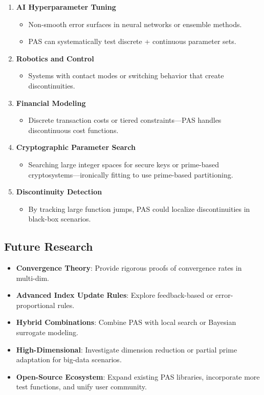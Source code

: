 \documentclass[10pt,twocolumn,letterpaper]{article}
\begin{document}
\begin{enumerate}
    \item \textbf{AI Hyperparameter Tuning}
    \begin{itemize}
        \item Non-smooth error surfaces in neural networks or ensemble methods.
        \item PAS can systematically test discrete + continuous parameter sets.
    \end{itemize}
    
    \item \textbf{Robotics and Control}
    \begin{itemize}
        \item Systems with contact modes or switching behavior that create discontinuities.
    \end{itemize}
    
    \item \textbf{Financial Modeling}
    \begin{itemize}
        \item Discrete transaction costs or tiered constraints—PAS handles discontinuous cost functions.
    \end{itemize}
    
    \item \textbf{Cryptographic Parameter Search}
    \begin{itemize}
        \item Searching large integer spaces for secure keys or prime-based cryptosystems—ironically fitting to use prime-based partitioning.
    \end{itemize}
    
    \item \textbf{Discontinuity Detection}
    \begin{itemize}
        \item By tracking large function jumps, PAS could localize discontinuities in black-box scenarios.
    \end{itemize}
\end{enumerate}

\subsection{Future Research}

\begin{itemize}
    \item \textbf{Convergence Theory}: Provide rigorous proofs of convergence rates in multi-dim.
    \item \textbf{Advanced Index Update Rules}: Explore feedback-based or error-proportional rules.
    \item \textbf{Hybrid Combinations}: Combine PAS with local search or Bayesian surrogate modeling.
    \item \textbf{High-Dimensional}: Investigate dimension reduction or partial prime adaptation for big-data scenarios.
    \item \textbf{Open-Source Ecosystem}: Expand existing PAS libraries, incorporate more test functions, and unify user community.
\end{itemize}
\end{document}
